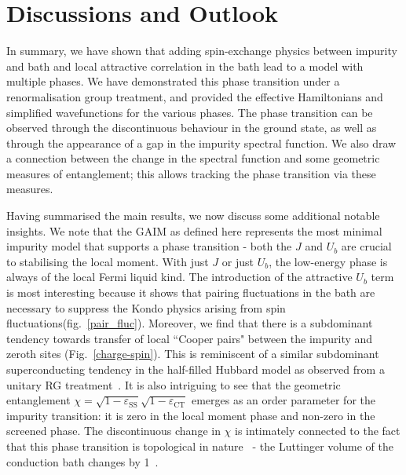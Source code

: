 \documentclass[reprint,superscriptaddress,floatfix]{revtex4-2}
\begin{document}
\section{Discussions and Outlook}
\label{concl}

In summary, we have shown that adding spin-exchange physics between impurity and bath and local attractive correlation in the bath lead to a model with multiple phases. We have demonstrated this phase transition under a renormalisation group treatment, and provided the effective Hamiltonians and simplified wavefunctions for the various phases. The phase transition can be observed through the discontinuous behaviour in the ground state, as well as through the appearance of a gap in the impurity spectral function. We also draw a connection between the change in the spectral function and some geometric measures of entanglement; this allows tracking the phase transition via these measures.

Having summarised the main results, we now discuss some additional notable insights. We note that the GAIM as defined here represents the most minimal impurity model that supports a phase transition - both the \(J\) and \(U_b\) are crucial to stabilising the local moment. With just \(J\) or just \(U_b\), the low-energy phase is always of the local Fermi liquid kind. The introduction of the attractive \(U_b\) term is most interesting because it shows that pairing fluctuations in the bath are necessary to suppress the Kondo physics arising from spin fluctuations(fig.~\ref{pair_fluc}). Moreover, we find that there is a subdominant tendency towards transfer of local ``Cooper pairs" between the impurity and zeroth sites (Fig.~\ref{charge-spin}). This is reminiscent of a similar subdominant superconducting tendency in the half-filled Hubbard model as observed from a unitary RG treatment~\cite{anirbanmott1,anirbanmott2}.
It is also intriguing to see that the geometric entanglement \(\chi = \sqrt{1 -\varepsilon_\text{SS}}\sqrt{1 -\varepsilon_\text{CT}}\) emerges as an order parameter for the impurity transition: it is zero in the local moment phase and non-zero in the screened phase. The discontinuous change in \(\chi\) is intimately connected to the fact that this phase transition is topological in nature~\cite{oshikawa2000topological,seki2017topological} -  the Luttinger volume of the conduction bath changes by 1~\cite{martin-physrevlett.48.362}.
\end{document}
